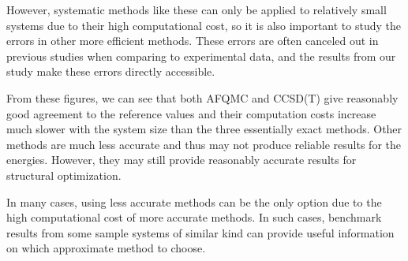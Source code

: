 However, systematic methods like these can only be applied to relatively small systems due to their high computational cost, so it is also important to study the errors in other more efficient methods.
These errors are often canceled out in previous studies when comparing to experimental data, and the results from our study make these errors directly accessible.

From these figures, we can see that both AFQMC and CCSD(T) give reasonably good agreement to the reference values and their computation costs increase much slower with the system size than the three essentially exact methods.
Other methods are much less accurate and thus may not produce reliable results for the energies.
However, they may still provide reasonably accurate results for structural optimization.

In many cases, using less accurate methods can be the only option due to the high computational cost of more accurate methods.
In such cases, benchmark results from some sample systems of similar kind can provide useful information on which approximate method to choose.
